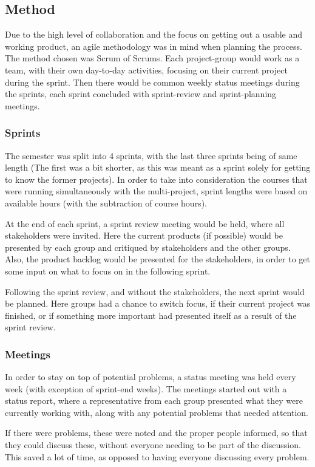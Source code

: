 \subsection{Method}
Due to the high level of collaboration and the focus on getting out a usable and working product, an agile methodology was in mind when planning the process.
The method chosen was Scrum of Scrums.
Each project-group would work as a team, with their own day-to-day activities, focusing on their current project during the sprint.
Then there would be common weekly status meetings during the sprints, each sprint concluded with sprint-review and sprint-planning meetings.

\subsubsection{Sprints}
The semester was split into 4 sprints, with the last three sprints being of same length (The first was a bit shorter, as this was meant as a sprint solely for getting to know the former projects).
In order to take into consideration the courses that were running simultaneously with the multi-project, sprint lengths were based on available hours (with the subtraction of course hours).

At the end of each sprint, a sprint review meeting would be held, where all stakeholders were invited.
Here the current products (if possible) would be presented by each group and critiqued by stakeholders and the other groups.
Also, the product backlog would be presented for the stakeholders, in order to get some input on what to focus on in the following sprint.

Following the sprint review, and without the stakeholders, the next sprint would be planned.
Here groups had a chance to switch focus, if their current project was finished, or if something more important had presented itself as a result of the sprint review.

\subsubsection{Meetings}
In order to stay on top of potential problems, a status meeting was held every week (with exception of sprint-end weeks).
The meetings started out with a status report, where a representative from each group presented what they were currently working with, along with any potential problems that needed attention.

If there were problems, these were noted and the proper people informed, so that they could discuss these, without everyone needing to be part of the discussion.
This saved a lot of time, as opposed to having everyone discussing every problem.

